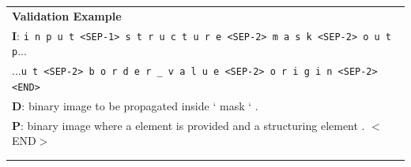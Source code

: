 \begin{table}
\begin{center}
\begin{tabular}{l}

\hline
\textbf{Validation Example}\\

\textbf{I}: \texttt{i n p u t <SEP-1> s t r u c t u r e <SEP-2> m a s k <SEP-2> o u t p}...\\
...\texttt{u t <SEP-2> b o r d e r _ v a l u e <SEP-2> o r i g i n <SEP-2> <END>}\\
\textbf{D}: binary image to be propagated inside ` mask ` .\\
\textbf{P}: binary image where a element is provided and a structuring element . $<$END$>$\\
\\\hline\\


\end{tabular}
\end{center}
\end{table}
